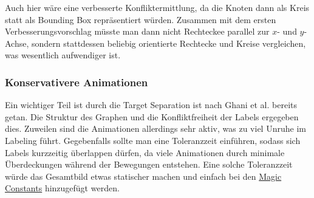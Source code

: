 Auch hier wäre eine verbesserte Konfliktermittlung, da die Knoten dann als Kreis statt als Bounding Box repräsentiert würden.
Zusammen mit dem ersten Verbesserungsvorschlag müsste man dann nicht Rechteckee parallel zur $x$- und $y$-Achse, sondern stattdessen beliebig orientierte Rechtecke und Kreise vergleichen, was wesentlich aufwendiger ist.

\subsubsection{Konservativere Animationen}
Ein wichtiger Teil ist durch die Target Separation ist nach Ghani et al. \cite{percept_animate} bereits getan. Die Struktur des Graphen und die Konfliktfreiheit der Labels ergegeben dies.
Zuweilen sind die Animationen allerdings sehr aktiv, was zu viel Unruhe im Labeling führt. Gegebenfalls sollte man eine Toleranzzeit einführen,
sodass sich Labels kurzzeitig überlappen dürfen, da viele Animationen durch minimale Überdeckungen während der Bewegungen entstehen.
Eine solche Toleranzzeit würde das Gesamtbild etwas statischer machen und einfach bei den \hyperref[subsec:consts]{Magic Constants} hinzugefügt werden.


